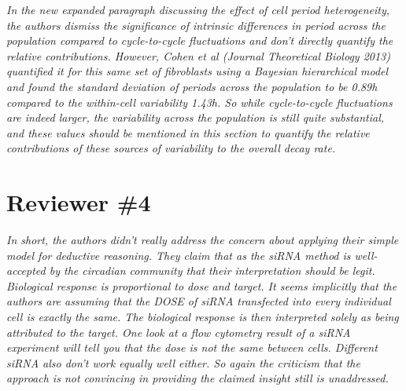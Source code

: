 \documentclass[11pt, letterpaper]{article}
\newenvironment{reviewer}{\itshape\color{gray}}{}
\begin{document}
\begin{reviewer}
In the new expanded paragraph discussing the effect of cell period heterogeneity, the authors dismiss the significance of intrinsic differences in period across the population compared to cycle-to-cycle fluctuations and don’t directly quantify the relative contributions. However, Cohen et al (Journal Theoretical Biology 2013) quantified it for this same set of fibroblasts using a Bayesian hierarchical model and found the standard deviation of periods across the population to be 0.89h compared to the within-cell variability 1.43h. So while cycle-to-cycle fluctuations are indeed larger, the variability across the population is still quite substantial, and these values should be mentioned in this section to quantify the relative contributions of these sources of variability to the overall decay rate.
\end{reviewer}

\section*{Reviewer \#4}

\begin{reviewer}
In short, the authors didn't really address the concern about applying their simple model for deductive reasoning. They claim that as the siRNA method is well-accepted by the circadian community that their interpretation should be legit. Biological response is proportional to dose and target. It seems implicitly that the authors are assuming that the DOSE of siRNA transfected into every individual cell is exactly the same. The biological response is then interpreted solely as being attributed to the target. One look at a flow cytometry result of a siRNA experiment will tell you that the dose is not the same between cells. Different siRNA also don't work equally well either. So again the criticism that the approach is not convincing in providing the claimed insight still is unaddressed.
\end{reviewer}
\end{document}
